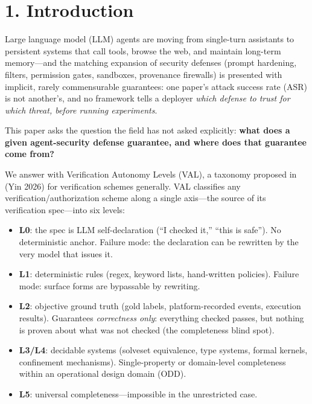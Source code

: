 \documentclass[11pt]{article}
\providecommand{\tightlist}{%

  \setlength{\itemsep}{0pt}\setlength{\parskip}{0pt}}
\begin{document}
\section{1. Introduction}\label{introduction}

Large language model (LLM) agents are moving from single-turn assistants to persistent systems that call tools, browse the web, and maintain long-term memory---and the matching expansion of security defenses (prompt hardening, filters, permission gates, sandboxes, provenance firewalls) is presented with implicit, rarely commensurable guarantees: one paper's attack success rate (ASR) is not another's, and no framework tells a deployer \emph{which defense to trust for which threat, before running experiments}.

This paper asks the question the field has not asked explicitly: \textbf{what does a given agent-security defense guarantee, and where does that guarantee come from?}

We answer with Verification Autonomy Levels (VAL), a taxonomy proposed in (Yin 2026) for verification schemes generally. VAL classifies any verification/authorization scheme along a single axis---the source of its verification spec---into six levels:

\begin{itemize}

\tightlist

\item

  \textbf{L0}: the spec is LLM self-declaration (``I checked it,'' ``this is safe''). No deterministic anchor. Failure mode: the declaration can be rewritten by the very model that issues it.

\item

  \textbf{L1}: deterministic rules (regex, keyword lists, hand-written policies). Failure mode: surface forms are bypassable by rewriting.

\item

  \textbf{L2}: objective ground truth (gold labels, platform-recorded events, execution results). Guarantees \emph{correctness only}: everything checked passes, but nothing is proven about what was not checked (the completeness blind spot).

\item

  \textbf{L3/L4}: decidable systems (solveset equivalence, type systems, formal kernels, confinement mechanisms). Single-property or domain-level completeness within an operational design domain (ODD).

\item

  \textbf{L5}: universal completeness---impossible in the unrestricted case.

\end{itemize}
\end{document}
